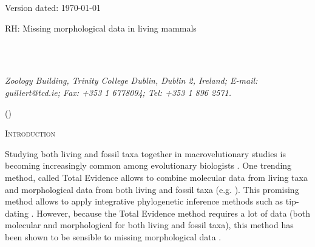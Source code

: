 \documentclass[12pt,letterpaper]{article}
\renewcommand{\section}[1]{%
\bigskip
\begin{center}
\begin{Large}
\normalfont\scshape #1
\medskip
\end{Large}
\end{center}}
\begin{document}
\begin{flushright}
Version dated: \today
\end{flushright}
\bigskip
\noindent RH: Missing morphological data in living mammals

\bigskip
\medskip
\begin{center}


\bigskip

\\
\\
\end{center}
\medskip
{} \textit{Zoology Building, Trinity College Dublin, Dublin 2, Ireland; E-mail: guillert@tcd.ie; Fax: +353 1 6778094; Tel: +353 1 896 2571.}\\
\vspace{1in}


%
%

\newpage
\begin{abstract}

\end{abstract}

\noindent ()\\

\vspace{1.5in}

\newpage 

%
%

\section{Introduction}
Studying both living and fossil taxa together in macrovelutionary studies is becoming increasingly common among evolutionary biologists \cite{jacksonwhat2006,quentaldiversity2010,dietlconservation2011,slaterunifying2013,fritzdiversity2013}. One trending method, called Total Evidence allows to combine molecular data from living taxa and morphological data from both living and fossil taxa (e.g. \cite{pyrondivergence2011,ronquista2012,schragocombining2013,slaterunifying2013,beckancient2014,Meseguer01032015}). This promising method allows to apply integrative phylogenetic inference methods such as tip-dating \cite{ronquista2012,Drummond01082012,BEASTmaster}. However, because the Total Evidence method requires a lot of data (both molecular and morphological for both living and fossil taxa), this method has been shown to be sensible to missing morphological data \cite{GuillermeCooper}.
\end{document}
